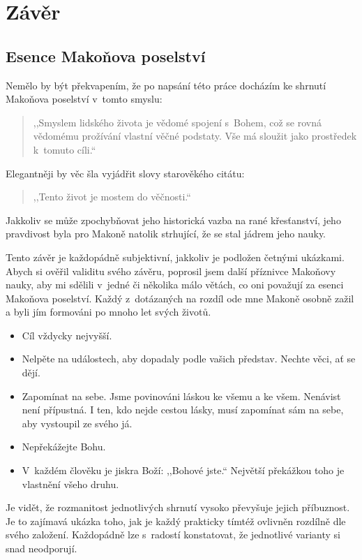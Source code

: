 \chapter{Závěr}

\section{Esence Makoňova poselství}

Nemělo by být překvapením, že po napsání této práce docházím ke shrnutí Makoňova
poselství v~tomto smyslu:
\begin{quote}
,,Smyslem lidského života je vědomé spojení s~Bohem,
což se rovná vědomému prožívání vlastní věčné podstaty. Vše má sloužit jako
prostředek k~tomuto cíli.``
\end{quote}
Elegantněji by věc šla vyjádřit slovy starověkého citátu:
\begin{quote}
,,Tento život je mostem do věčnosti.``
\end{quote}
Jakkoliv se může zpochybňovat jeho historická vazba na rané
křesťanství\cite{dus2001neznama}, jeho pravdivost byla pro Makoně natolik
strhující, že se stal jádrem jeho nauky.

Tento závěr je každopádně subjektivní, jakkoliv je podložen četnými ukázkami.
Abych si ověřil validitu svého závěru, poprosil jsem další příznivce Makoňovy
nauky, aby mi sdělili v~jedné či několika málo větách, co oni považují za esenci
Makoňova poselství. Každý z~dotázaných na rozdíl ode mne Makoně osobně zažil a
byli jím formováni po mnoho let svých životů.

\begin{itemize}
\item{Cíl vždycky nejvyšší.}
\item{Nelpěte na událostech, aby dopadaly podle vašich představ. Nechte věci, ať
  se dějí.}
\item{Zapomínat na sebe. Jsme povinováni láskou ke všemu a ke všem. Nenávist
  není přípustná. I ten, kdo nejde cestou lásky, musí zapomínat sám na sebe, aby
    vystoupil ze svého já.}
\item{Nepřekážejte Bohu.}
\item{V~každém člověku je jiskra Boží: ,,Bohové jste.`` Největší překážkou toho
  je vlastnění všeho druhu.}
\end{itemize}

Je vidět, že rozmanitost jednotlivých shrnutí vysoko převyšuje jejich
příbuznost. Je to zajímavá ukázka toho, jak je každý prakticky tímtéž ovlivněn
rozdílně dle svého založení. Každopádně lze s~radostí konstatovat, že jednotlivé
varianty si snad neodporují.

